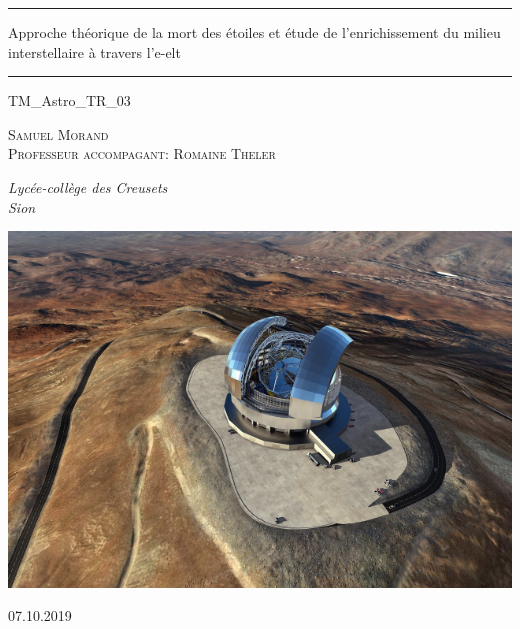 \documentclass[11pt,a4paper,twoside]{report}
\begin{document}
\begin{titlepage} 
	
	\centering 
	
	\scshape 
	
	\vspace*{\baselineskip}
	
	\rule{\textwidth}{0.4pt} 
	
	\vspace{0.75\baselineskip} 
	
	{\LARGE Approche théorique de la mort des étoiles et étude de l'enrichissement du milieu interstellaire à travers l'e-elt} 
	
	\vspace{0.75\baselineskip} 
	
	\rule{\textwidth}{0.4pt}\vspace*{-\baselineskip}\vspace{3.2pt} 
	
	\vspace{2\baselineskip} 
	
	TM\_Astro\_TR\_03
	
	\vspace*{2\baselineskip} 
	
	{\scshape\Large Samuel Morand \\ Professeur accompagant: Romaine Theler \\} 
	
	\vspace*{2\baselineskip}
	
	\textit{Lycée-collège des Creusets \\ Sion} 
	
	\vspace{3cm}
	
	\includegraphics[scale=1]{images/e-elt}
	
	\vfill 
	
	07.10.2019

\end{titlepage}
\end{document}
